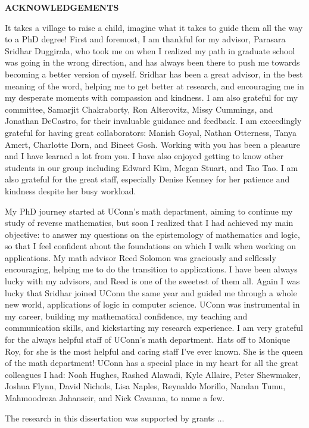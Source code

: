 
\begin{center}
\vspace*{52pt}
{\textbf{ACKNOWLEDGEMENTS}}
\end{center}

It takes a village to raise a child, imagine what it takes to guide them all the way to a PhD degree!
%
First and foremost, I am thankful for my advisor, Parasara Sridhar Duggirala, who took me on when I realized my path in graduate school was going in the wrong direction, and has always been there to push me towards becoming a better version of myself.
%
Sridhar has been a great advisor, in the best meaning of the word, helping me to get better at research, and encouraging me in my desperate moments with compassion and kindness.
%
I am also grateful for my committee, Samarjit Chakraborty, Ron Alterovitz, Missy Cummings, and Jonathan DeCastro, for their invaluable guidance and feedback.
%
I am exceedingly grateful for having great collaborators: Manish Goyal, Nathan Otterness, Tanya Amert, Charlotte Dorn, and Bineet Gosh.
%
Working with you has been a pleasure and I have learned a lot from you.
%
I have also enjoyed getting to know other students in our group including Edward Kim, Megan Stuart, and Tao Tao.
%
I am also grateful for the great staff, especially Denise Kenney for her patience and kindness despite her busy workload.


My PhD journey started at UConn's math department, aiming to continue my study of reverse mathematics, but soon I realized that I had achieved my main objective: to answer my questions on the epistemology of mathematics and logic, so that I feel confident about the foundations on which I walk when working on applications.
%
My math advisor Reed Solomon was graciously and selflessly encouraging, helping me to do the transition to applications.
%
I have been always lucky with my advisors, and Reed is one of the sweetest of them all.
%
Again I was lucky that Sridhar joined UConn the same year and guided me through a whole new world, applications of logic in computer science.
%
UConn was instrumental in my career, building my mathematical confidence, my teaching and communication skills, and kickstarting my research experience.
%
I am very grateful for the always helpful staff of UConn's math department.
%
Hats off to Monique Roy, for she is the most helpful and caring staff I've ever known.
%
She is the queen of the math department!
%
UConn has a special place in my heart for all the great colleagues I had: Noah Hughes, Rashed Alawadi, Kyle Allaire, Peter Shewmaker, Joshua Flynn, David Nichols, Lisa Naples, Reynaldo Morillo, Nandan Tumu, Mahmoodreza Jahanseir, and Nick Cavanna, to name a few.
%


The research in this dissertation was supported by grants ...


\clearpage
